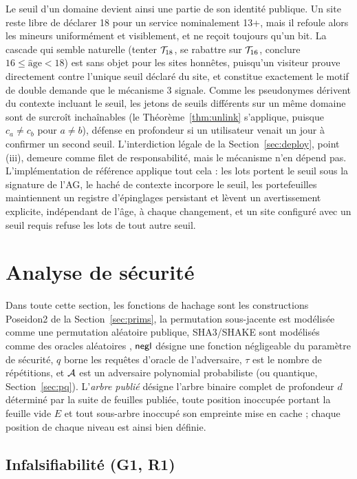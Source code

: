 \documentclass[11pt]{article}
\theoremstyle{definition}
\begin{document}
Le seuil d'un domaine devient ainsi une partie de son identité publique. Un site reste
libre de déclarer 18 pour un service nominalement 13+, mais il refoule alors les mineurs
uniformément et visiblement, et ne reçoit toujours qu'un bit. La cascade qui semble
naturelle (tenter $\mathcal{T}_{18}$, se rabattre sur $\mathcal{T}_{16}$, conclure $16 \le \mathrm{\hat{a}ge}
< 18$) est sans objet pour les sites honnêtes, puisqu'un visiteur prouve directement
contre l'unique seuil déclaré du site, et constitue exactement le motif de double demande
que le mécanisme 3 signale. Comme les pseudonymes dérivent du contexte incluant le seuil,
les jetons de seuils différents sur un même domaine sont de surcroît inchaînables (le
Théorème~\ref{thm:unlink} s'applique, puisque $c_a \ne c_b$ pour $a \ne b$), défense en
profondeur si un utilisateur venait un jour à confirmer un second seuil. L'interdiction
légale de la Section~\ref{sec:deploy}, point (iii), demeure comme filet de
responsabilité, mais le mécanisme n'en dépend pas. L'implémentation de référence applique
tout cela : les lots portent le seuil sous la signature de l'AG, le haché de contexte
incorpore le seuil, les portefeuilles maintiennent un registre d'épinglages persistant et
lèvent un avertissement explicite, indépendant de l'âge, à chaque changement, et un site
configuré avec un seuil requis refuse les lots de tout autre seuil.

\section{Analyse de sécurité}
\label{sec:security}

Dans toute cette section, les fonctions de hachage sont les constructions Poseidon2 de la
Section~\ref{sec:prims}, la permutation sous-jacente est modélisée comme une permutation
aléatoire publique, SHA3/SHAKE sont modélisés comme des oracles aléatoires \cite{bellrog},
$\mathsf{negl}$ désigne une fonction négligeable du paramètre de sécurité, $q$ borne les requêtes
d'oracle de l'adversaire, $\tau$ est le nombre de répétitions, et $\mathcal{A}$ est un
adversaire polynomial probabiliste (ou quantique, Section~\ref{sec:pq}). L'\emph{arbre
publié} désigne l'arbre binaire complet de profondeur $d$ déterminé par la suite de
feuilles publiée, toute position inoccupée portant la feuille vide $E$ et tout sous-arbre
inoccupé son empreinte mise en cache ; chaque position de chaque niveau est ainsi bien
définie.

\subsection{Infalsifiabilité (G1, R1)}
\end{document}
